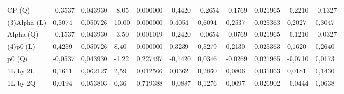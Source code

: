 \begin{table}[H]
{\begin{tabular}{lllllllllll}
CP      (Q)    & {\color[HTML]{FF0000} -0,3537}  & {\color[HTML]{FF0000} 0,043930} & {\color[HTML]{FF0000} -8,05}    & {\color[HTML]{FF0000} 0,000000} & {\color[HTML]{FF0000} -0,4420}  & {\color[HTML]{FF0000} -0,2654}  & {\color[HTML]{FF0000} -0,1769}  & {\color[HTML]{FF0000} 0,021965} & {\color[HTML]{FF0000} -0,2210}  & {\color[HTML]{FF0000} -0,1327}  \\
\rowcolor[HTML]{FFFFFF} 
(3)Alpha   (L) & {\color[HTML]{FF0000} 0,5074}   & {\color[HTML]{FF0000} 0,050726} & {\color[HTML]{FF0000} 10,00}    & {\color[HTML]{FF0000} 0,000000} & {\color[HTML]{FF0000} 0,4054}   & {\color[HTML]{FF0000} 0,6094}   & {\color[HTML]{FF0000} 0,2537}   & {\color[HTML]{FF0000} 0,025363} & {\color[HTML]{FF0000} 0,2027}   & {\color[HTML]{FF0000} 0,3047}   \\
\rowcolor[HTML]{FFFFFF} 
Alpha   (Q)    & {\color[HTML]{FF0000} -0,1537}  & {\color[HTML]{FF0000} 0,043930} & {\color[HTML]{FF0000} -3,50}    & {\color[HTML]{FF0000} 0,001019} & {\color[HTML]{FF0000} -0,2420}  & {\color[HTML]{FF0000} -0,0654}  & {\color[HTML]{FF0000} -0,0769}  & {\color[HTML]{FF0000} 0,021965} & {\color[HTML]{FF0000} -0,1210}  & {\color[HTML]{FF0000} -0,0327}  \\
\rowcolor[HTML]{FFFFFF} 
(4)p0      (L) & {\color[HTML]{FF0000} 0,4259}   & {\color[HTML]{FF0000} 0,050726} & {\color[HTML]{FF0000} 8,40}     & {\color[HTML]{FF0000} 0,000000} & {\color[HTML]{FF0000} 0,3239}   & {\color[HTML]{FF0000} 0,5279}   & {\color[HTML]{FF0000} 0,2130}   & {\color[HTML]{FF0000} 0,025363} & {\color[HTML]{FF0000} 0,1620}   & {\color[HTML]{FF0000} 0,2640}   \\
\rowcolor[HTML]{FFFFFF} 
p0      (Q)    & {\color[HTML]{333333} -0,0537}  & {\color[HTML]{333333} 0,043930} & {\color[HTML]{333333} -1,22}    & {\color[HTML]{333333} 0,227497} & {\color[HTML]{333333} -0,1420}  & {\color[HTML]{333333} 0,0346}   & {\color[HTML]{333333} -0,0269}  & {\color[HTML]{333333} 0,021965} & {\color[HTML]{333333} -0,0710}  & {\color[HTML]{333333} 0,0173}   \\
\rowcolor[HTML]{FFFFFF} 
1L by 2L       & {\color[HTML]{FF0000} 0,1611}   & {\color[HTML]{FF0000} 0,062127} & {\color[HTML]{FF0000} 2,59}     & {\color[HTML]{FF0000} 0,012566} & {\color[HTML]{FF0000} 0,0362}   & {\color[HTML]{FF0000} 0,2860}   & {\color[HTML]{FF0000} 0,0806}   & {\color[HTML]{FF0000} 0,031063} & {\color[HTML]{FF0000} 0,0181}   & {\color[HTML]{FF0000} 0,1430}   \\
\rowcolor[HTML]{FFFFFF} 
1L by 2Q       & {\color[HTML]{333333} 0,0194}   & {\color[HTML]{333333} 0,053803} & {\color[HTML]{333333} 0,36}     & {\color[HTML]{333333} 0,719388} & {\color[HTML]{333333} -0,0887}  & {\color[HTML]{333333} 0,1276}   & {\color[HTML]{333333} 0,0097}   & {\color[HTML]{333333} 0,026902} & {\color[HTML]{333333} -0,0444}  & {\color[HTML]{333333} 0,0638}   \\

\end{tabular}}
\end{table}
